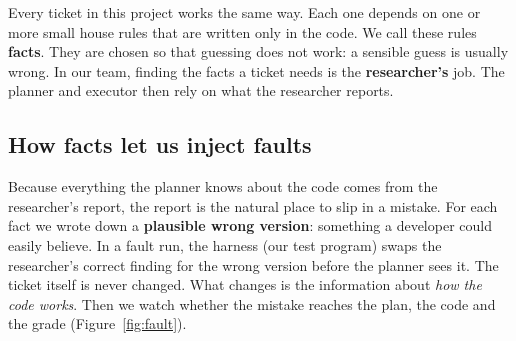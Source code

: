 \documentclass{article}
\begin{document}
Every ticket in this project works the same way. Each one depends on one or more small house rules that are written only in the code. We call these rules \textbf{facts}. They are chosen so that guessing does not work: a sensible guess is usually wrong. In our team, finding the facts a ticket needs is the \textbf{researcher's} job. The planner and executor then rely on what the researcher reports.

\subsection{How facts let us inject faults}

Because everything the planner knows about the code comes from the researcher's report, the report is the natural place to slip in a mistake. For each fact we wrote down a \textbf{plausible wrong version}: something a developer could easily believe. In a fault run, the harness (our test program) swaps the researcher's correct finding for the wrong version before the planner sees it. The ticket itself is never changed. What changes is the information about \emph{how the code works}. Then we watch whether the mistake reaches the plan, the code and the grade (Figure~\ref{fig:fault}).
\end{document}
